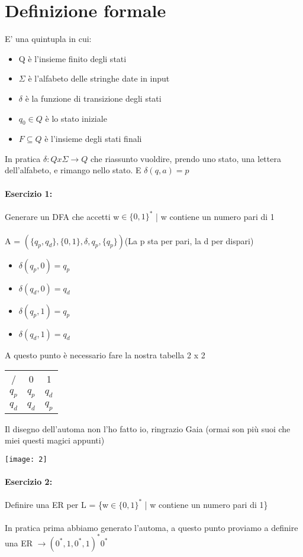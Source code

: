 \documentclass[12pt, a4paper, openany, oneside]{book}
\begin{document}
\section{Definizione formale}
E' una quintupla in cui:
\begin{itemize}
	\item Q è l'insieme finito degli stati
	\item $\Sigma$ è l'alfabeto delle stringhe date in input
	\item $\delta$ è la funzione di transizione degli stati
	\item $q_{0}\in Q$ è lo stato iniziale
	\item $F \subseteq Q$ è l'insieme degli stati finali
\end{itemize}
In pratica $\delta:Qx\Sigma \to Q$ che riassunto vuoldire, prendo uno stato, 
una lettera dell'alfabeto, e rimango nello stato. E $\delta(q,a) = p$
\paragraph{Esercizio 1: } Generare un DFA che accetti w$\in \{0,1\}^{*}$ | w
contiene un numero pari di 1 \\ \\
A = $(\{q_{p}, q_{d}\}, \{0,1\}, \delta, q_{p}, \{q_{p}\}) $(La p sta per pari,
la d per dispari)
\begin{itemize}
	\item $\delta(q_{p}, 0) = q_{p}$
	\item $\delta(q_{d}, 0) = q_{d}$
	\item $\delta(q_{p}, 1) = q_{p}$
	\item $\delta(q_{d}, 1) = q_{d}$
\end{itemize}
A questo punto è necessario fare la nostra tabella 2 x 2 
\begin{center}
\begin{tabular}{ | c | c | c }
/ &  0 & 1 \\ 
$q_{p}$ & $q_{p}$  &  $q_{d}$ \\  
$q_{d}$ &  $q_{d}$ & $q_{p}$     
\end{tabular}
\end{center}
Il disegno dell'automa non l'ho fatto io, ringrazio Gaia (ormai son più suoi
che miei questi magici appunti)
\begin{center}
\texttt{[image: 2]}
\end{center}
\paragraph{Esercizio 2: } Definire una ER per L = \{w$\in \{0,1\}^{*}$ | w
contiene un numero pari di 1\} \\ \\
In pratica prima abbiamo generato l'automa, a questo punto proviamo a definire
una ER $\to (0^{*},1,0^{*},1)^{*}0^{*}$
\end{document}
